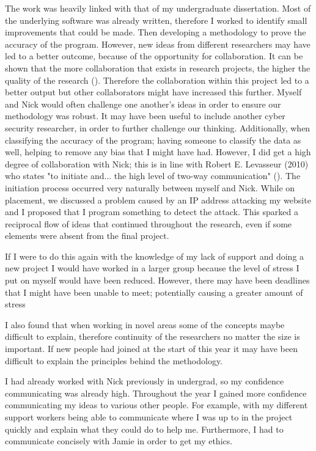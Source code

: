 The work was heavily linked with that of my undergraduate dissertation. Most of the underlying software was already written, therefore I worked to identify small improvements that could be made. Then developing a methodology to prove the accuracy of the program. However, new ideas from different researchers may have led to a better outcome, because of the opportunity for collaboration. It can be shown that the more collaboration that exists in research projects, the higher the quality of the research (\cite{figg2006scientific}). Therefore the collaboration within this project led to a better output but other collaborators might have increased this further. Myself and Nick would often challenge one another's ideas in order to ensure our methodology was robust. It may have been useful to include another cyber security researcher, in order to further challenge our thinking. Additionally, when classifying the accuracy of the program; having someone to classify the data as well, helping to remove any bias that I might have had. However, I did get a high degree of collaboration with Nick; this is in line with Robert E. Levasseur (2010) who states "to initiate and... the high level of two-way communication" (\cite{levasseur2010people}). The initiation process occurred very naturally between myself and Nick. While on placement, we discussed a problem caused by an IP address attacking my website and I proposed that I program something to detect the attack. This sparked a reciprocal flow of ideas that continued throughout the research, even if some elements were absent from the final project. 



If I were to do this again with the knowledge of my lack of support and doing a new project I would have worked in a larger group because the level of stress I put on myself would have been reduced. However, there may have been deadlines that I might have been unable to meet; potentially causing a greater amount of stress




I also found that when working in novel areas some of the concepts maybe difficult to explain, therefore continuity of the researchers no matter the size is important. If new people had joined at the start of this year it may have been difficult to explain the principles behind the methodology. 

I had already worked with Nick previously in undergrad, so my confidence communicating was already high. Throughout the year I gained more confidence communicating my ideas to various other people. For example, with my different support workers being able to communicate where I was up to in the project quickly and explain what they could do to help me. Furthermore, I had to communicate concisely with Jamie in order to get my ethics. 


